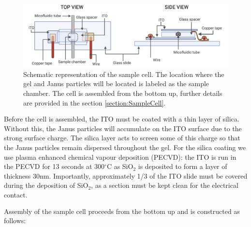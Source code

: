\begin{figure}
	\centering
	\includegraphics[width=\linewidth]{figsExpSystem/figSampleCell}
	\caption[Schematic representation of the sample cell.]{Schematic representation of the sample cell. The location where the gel and Janus particles will be located is labeled as the sample chamber. The cell is assembled from the bottom up, further details are provided in the section \ref{section:SampleCell}.}
	\label{fig:SampleCell}
\end{figure}

Before the cell is assembled, the ITO must be coated with a thin layer of silica. Without this, the Janus particles will accumulate on the ITO surface due to the strong surface charge.
The silica layer acts to screen some of this charge so that the Janus particles remain dispersed throughout the gel. For the silica coating we use plasma enhanced chemical vapour deposition (PECVD): the ITO is run in the PECVD for 13 seconds at 300$^{\circ}$C as SiO$_2$ is deposited to form a layer of thickness 30nm. Importantly, approximately 1/3 of the ITO slide must be covered during the deposition of SiO$_2$, as a section must be kept clean for the electrical contact. 

Assembly of the sample cell proceeds from the bottom up and is constructed as follows:

